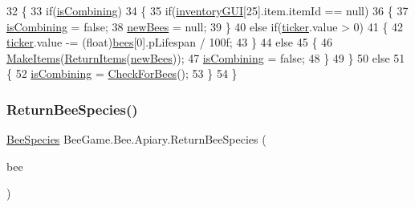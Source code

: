 \begin{DoxyCode}
32         \{
33             \textcolor{keywordflow}{if}(\hyperlink{class_bee_game_1_1_bee_1_1_apiary_ae6f4b8692da57eba10d3b593430b2384}{isCombining})
34             \{
35                 \textcolor{keywordflow}{if}(\hyperlink{class_bee_game_1_1_inventory_1_1_inventory_base_a48dcba7ad7bfa1bed8c9ae290fb32857}{inventoryGUI}[25].item.itemId == null)
36                 \{
37                     \hyperlink{class_bee_game_1_1_bee_1_1_apiary_ae6f4b8692da57eba10d3b593430b2384}{isCombining} = \textcolor{keyword}{false};
38                     \hyperlink{class_bee_game_1_1_bee_1_1_apiary_a930b4325062b0d6c80581784c23976e8}{newBees} = null;
39                 \}
40                 \textcolor{keywordflow}{else} \textcolor{keywordflow}{if}(\hyperlink{class_bee_game_1_1_bee_1_1_apiary_a7af4d39f709090d5e5f0c8877e3bbb8d}{ticker}.value > 0)
41                 \{
42                     \hyperlink{class_bee_game_1_1_bee_1_1_apiary_a7af4d39f709090d5e5f0c8877e3bbb8d}{ticker}.value -= (float)\hyperlink{class_bee_game_1_1_bee_1_1_apiary_abcab0d8cecc18c58a9d01cdf997c7420}{bees}[0].pLifespan / 100f;
43                 \}
44                 \textcolor{keywordflow}{else}
45                 \{
46                     \hyperlink{class_bee_game_1_1_bee_1_1_apiary_aaa6f9e38434722e3db40ae753a8bb752}{MakeItems}(\hyperlink{class_bee_game_1_1_bee_1_1_apiary_abb65875e61a806c8b2787d0c7d8229bd}{ReturnItems}(\hyperlink{class_bee_game_1_1_bee_1_1_apiary_a930b4325062b0d6c80581784c23976e8}{newBees}));
47                     \hyperlink{class_bee_game_1_1_bee_1_1_apiary_ae6f4b8692da57eba10d3b593430b2384}{isCombining} = \textcolor{keyword}{false};
48                 \}
49             \}
50             \textcolor{keywordflow}{else}
51             \{
52                 \hyperlink{class_bee_game_1_1_bee_1_1_apiary_ae6f4b8692da57eba10d3b593430b2384}{isCombining} = \hyperlink{class_bee_game_1_1_bee_1_1_apiary_ac8dbe3e7896909c1fd16f4f998f7b137}{CheckForBees}();
53             \}
54         \}
\end{DoxyCode}
\mbox{\label{class_bee_game_1_1_bee_1_1_apiary_ae8d3e50eae58fd390e27203d76124f27}} 
\subsubsection{\texorpdfstring{Return\+Bee\+Species()}{ReturnBeeSpecies()}}
{\footnotesize\ttfamily \hyperlink{namespace_bee_game_1_1_enums_aa2ead984825678d83c42d48f6382619c}{Bee\+Species} Bee\+Game.\+Bee.\+Apiary.\+Return\+Bee\+Species (\begin{DoxyParamCaption}\item[{\hyperlink{struct_bee_game_1_1_bee_1_1_bee_data}{Bee\+Data}}]{bee }\end{DoxyParamCaption})\hspace{0.3cm}{\ttfamily [private]}}



